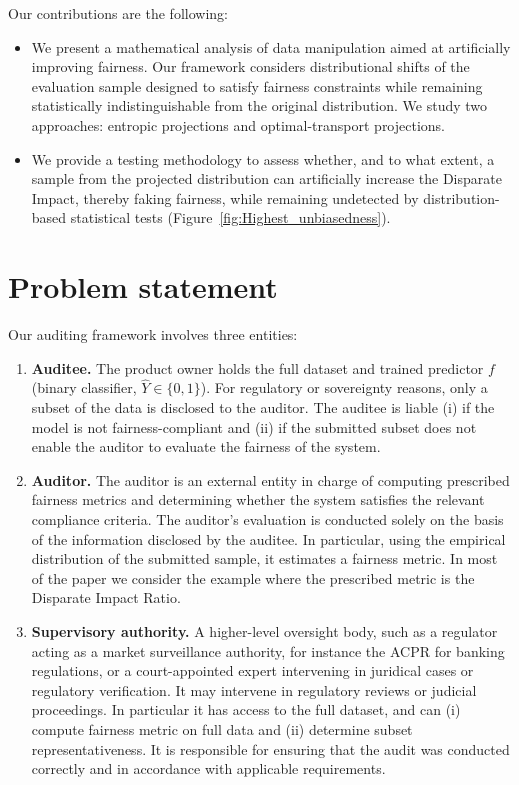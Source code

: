 \documentclass[runningheads, orivec]{llncs}
\begin{document}
Our contributions are the following:
\begin{itemize}
    \item We present a mathematical analysis of data manipulation aimed at artificially improving fairness. Our framework considers distributional shifts of the evaluation sample designed to satisfy fairness constraints while remaining statistically indistinguishable from the original distribution. We study two approaches: entropic projections and optimal-transport projections.
    \item We provide a testing methodology to assess whether, and to what extent, a sample from the projected distribution can artificially increase the  Disparate Impact, thereby faking fairness, while remaining undetected by distribution-based statistical tests (Figure~\ref{fig:Highest_unbiasedness}).
\end{itemize}

\section{Problem statement}

Our auditing framework involves three entities:
\begin{enumerate}
    \item \textbf{Auditee.} The product owner holds the full dataset and trained predictor $f$ (binary classifier, $\widehat{Y}\in\{0,1\}$). For regulatory or sovereignty reasons, only a subset of the data is disclosed to the auditor. The auditee is liable (i) if the model is not fairness-compliant and (ii) if the submitted subset does not enable the auditor to evaluate the fairness of the system.
    \item \textbf{Auditor.} The auditor is an external entity in charge of computing prescribed fairness metrics and determining whether the system satisfies the relevant compliance criteria. The auditor’s evaluation is conducted solely on the basis of the information disclosed by the auditee. In particular, using the empirical distribution of the submitted sample, it estimates a fairness metric. In most of the paper we consider the example where the prescribed metric is the Disparate Impact Ratio.
    \item \textbf{Supervisory authority.} A higher-level oversight body, such as a regulator acting as a market surveillance authority, for instance the ACPR for banking regulations, or a court-appointed expert intervening in juridical cases or regulatory verification. It may intervene in regulatory reviews or judicial proceedings. In particular it has access to the full dataset, and can (i) compute fairness metric on full data and (ii) determine subset representativeness. It is responsible for ensuring that the audit was conducted correctly and in accordance with applicable requirements.
\end{enumerate}
\end{document}
